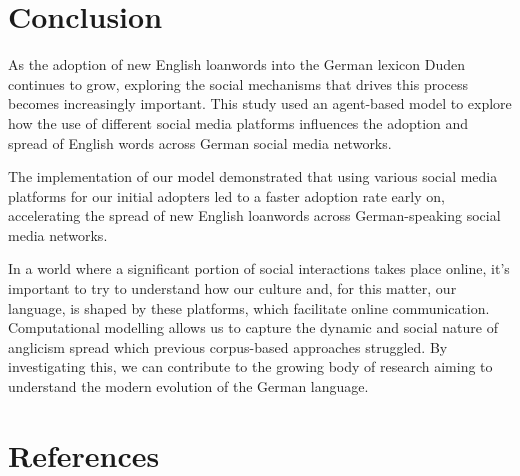 \documentclass[12pt]{article}
\begin{document}
\section{Conclusion}

As the adoption of new English loanwords into the German lexicon Duden continues to grow, exploring the social mechanisms that drives this process becomes increasingly important. This study used an agent-based model to explore how the use of different social media platforms influences the adoption and spread of English words across German social media networks.   

The implementation of our model demonstrated that using various social media platforms for our initial adopters led to a faster adoption rate early on, accelerating the spread of new English loanwords across German-speaking social media networks. 

In a world where a significant portion of social interactions takes place online, it’s important to try to understand how our culture and, for this matter, our language, is shaped by these platforms, which facilitate online communication. Computational modelling allows us to capture the dynamic and social nature of anglicism spread which previous corpus-based approaches struggled. By investigating this, we can contribute to the growing body of research aiming to understand the modern evolution of the German language. 


\section{References}
\printbibliography[heading=none]
\end{document}

